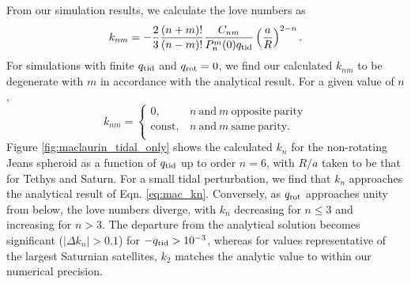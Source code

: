 From our simulation results, we calculate the love numbers as
%
\begin{equation}
\begin{aligned}
    k_{nm} = -\frac{2}{3}\frac{(n+m)!}{(n-m)!}\frac{C_{nm}}{P_n^m(0)q_{\rm tid}}
    \left( \frac{a}{R} \right)^{2-n}.
\end{aligned}
\label{eq:kn}
\end{equation}
%
For simulations with finite $q_{\rm tid}$ and $q_{\rm rot}=0$, we find our calculated
$k_{nm}$ to be degenerate with $m$ in accordance with the analytical result. For a
given value of $n$, 
%
\begin{equation}
    k_{nm} = \begin{cases}
        0, & n \mathrm{~and~} m \mathrm{~opposite~parity} \\
        \mathrm{const}, & n \mathrm{~and~} m \mathrm{~same~parity}. \\
    \end{cases}
    \label{eq:degenerate}
\end{equation}
%
Figure \ref{fig:maclaurin_tidal_only} shows the calculated $k_n$ for the non-rotating
Jeans spheroid as a function of $q_{\rm tid}$ up to order $n=6$, with $R/a$ taken
to be that for Tethys and Saturn. For a small tidal perturbation, we find that $k_n$
approaches the analytical result of Eqn. \eqref{eq:mac_kn}. Conversely, as $q_{\rm
rot}$ approaches unity from below, the love numbers diverge, with $k_n$ decreasing
for $n\leq3$ and increasing for $n>3$. The departure from the analytical solution
becomes significant ($\left|\Delta k_n\right| > 0.1$) for $-q_{\rm tid}>10^{-3}$,
whereas for values representative of the largest Saturnian satellites, $k_2$ matches
the analytic value to within our numerical precision.

